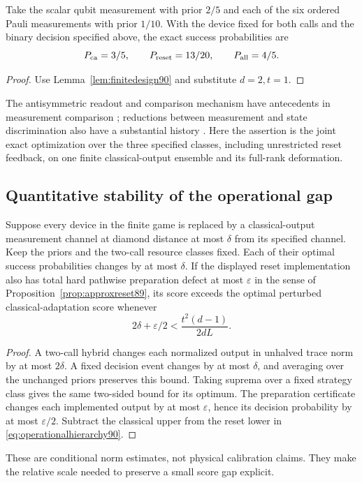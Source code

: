 \begin{corollary}\label{cor:qubitgame90}
Take the scalar qubit measurement with prior $2/5$ and each of the six
ordered Pauli measurements with prior $1/10$.  With the device fixed
for both calls and the binary decision specified above, the exact
success probabilities are
\[
 P_{\rm ca}=3/5,\qquad P_{\rm reset}=13/20,\qquad P_{\rm all}=4/5.
\]
\end{corollary}
\begin{proof}
Use Lemma~\ref{lem:finitedesign90} and substitute $d=2,t=1$.
\end{proof}
The antisymmetric readout and comparison mechanism have antecedents in
measurement comparison \cite{ZHS90}; reductions between measurement and
state discrimination also have a substantial history \cite{SZ74}.
Here the assertion is the joint exact optimization over the three
specified classes, including unrestricted reset feedback, on one finite
classical-output ensemble and its full-rank deformation.

\subsection{Quantitative stability of the operational gap}
\begin{corollary}\label{cor:robustgame90}
Suppose every device in the finite game is replaced by a classical-output
measurement channel at diamond distance at most $\delta$ from its
specified channel.  Keep the priors and the two-call resource classes
fixed.  Each of their optimal success probabilities changes by at most
$\delta$.  If the displayed reset implementation also has total hard
pathwise preparation defect at most $\varepsilon$ in the sense of
Proposition~\ref{prop:approxreset89}, its score exceeds the optimal
perturbed classical-adaptation score whenever
\begin{equation}\label{eq:robustgap90}
 2\delta+\varepsilon/2<\frac{t^2(d-1)}{2dL}.
\end{equation}
\end{corollary}
\begin{proof}
A two-call hybrid changes each normalized output in unhalved trace norm
by at most $2\delta$.  A fixed decision event changes by at most
$\delta$, and averaging over the unchanged priors preserves this bound.
Taking suprema over a fixed strategy class gives the same two-sided
bound for its optimum.  The preparation certificate changes each
implemented output by at most $\varepsilon$, hence its decision
probability by at most $\varepsilon/2$.  Subtract the classical upper
from the reset lower in \eqref{eq:operationalhierarchy90}.
\end{proof}
These are conditional norm estimates, not physical calibration claims.
They make the relative scale needed to preserve a small score gap explicit.

